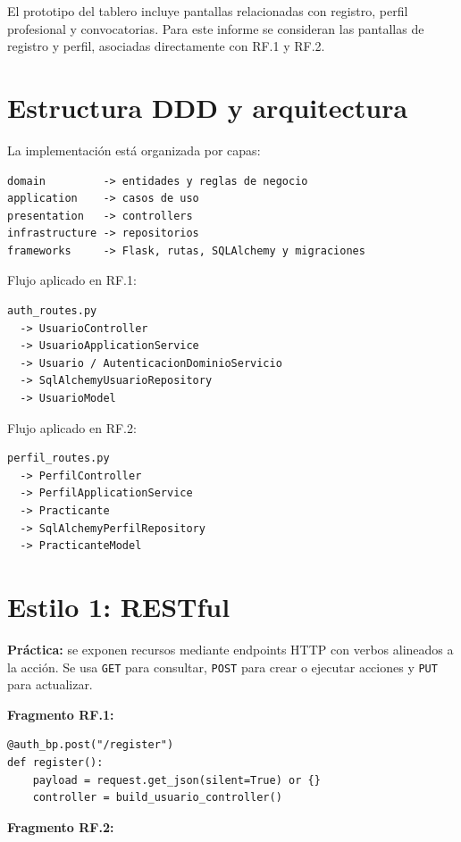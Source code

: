 \documentclass[12pt,a4paper]{article}
\begin{document}
El prototipo del tablero incluye pantallas relacionadas con registro, perfil profesional y convocatorias. Para este informe se consideran las pantallas de registro y perfil, asociadas directamente con RF.1 y RF.2.

\section{Estructura DDD y arquitectura}

La implementación está organizada por capas:

\begin{lstlisting}[style=textstyle]
domain         -> entidades y reglas de negocio
application    -> casos de uso
presentation   -> controllers
infrastructure -> repositorios
frameworks     -> Flask, rutas, SQLAlchemy y migraciones
\end{lstlisting}

Flujo aplicado en RF.1:

\begin{lstlisting}[style=textstyle]
auth_routes.py
  -> UsuarioController
  -> UsuarioApplicationService
  -> Usuario / AutenticacionDominioServicio
  -> SqlAlchemyUsuarioRepository
  -> UsuarioModel
\end{lstlisting}

Flujo aplicado en RF.2:

\begin{lstlisting}[style=textstyle]
perfil_routes.py
  -> PerfilController
  -> PerfilApplicationService
  -> Practicante
  -> SqlAlchemyPerfilRepository
  -> PracticanteModel
\end{lstlisting}

\section{Estilo 1: RESTful}

\textbf{Práctica:} se exponen recursos mediante endpoints HTTP con verbos alineados a la acción. Se usa \texttt{GET} para consultar, \texttt{POST} para crear o ejecutar acciones y \texttt{PUT} para actualizar.

\textbf{Fragmento RF.1:}

\begin{lstlisting}[style=pythonstyle]
@auth_bp.post("/register")
def register():
    payload = request.get_json(silent=True) or {}
    controller = build_usuario_controller()
\end{lstlisting}

\textbf{Fragmento RF.2:}
\end{document}

